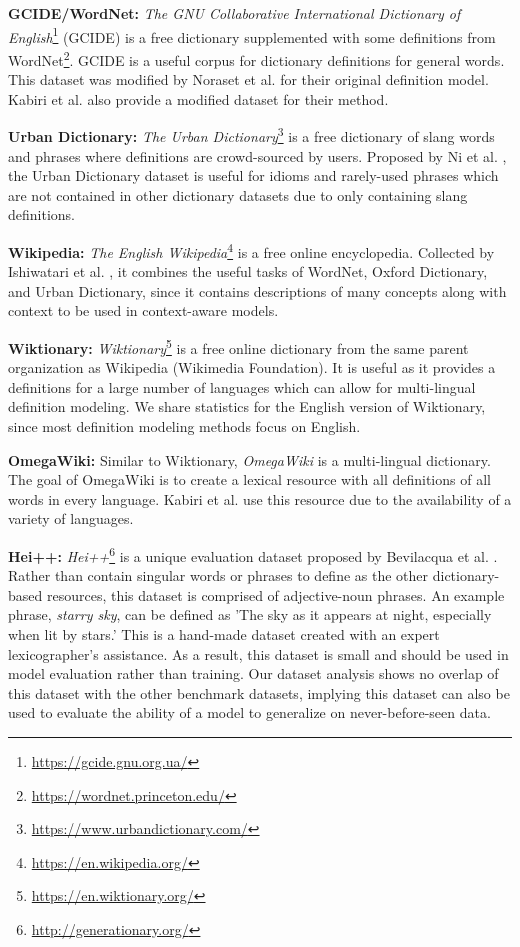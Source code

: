 \noindent\textbf{GCIDE/WordNet:}
\textit{The GNU Collaborative International Dictionary of
    English}\footnote{\href{https://gcide.gnu.org.ua/}{https://gcide.gnu.org.ua/}}
(GCIDE) is a free dictionary supplemented with some definitions from
WordNet\footnote{\href{https://wordnet.princeton.edu/}{https://wordnet.princeton.edu/}}.
GCIDE is a useful corpus for
dictionary definitions for general words. This dataset was modified by
Noraset et al. \cite{noraset_definition_2016} for their original definition
model. Kabiri et al. \cite{kabiri_evaluating_2020} also provide a modified
dataset for their method.

\noindent\textbf{Urban Dictionary:}
\textit{The Urban
    Dictionary}\footnote{\href{https://www.urbandictionary.com/}{https://www.urbandictionary.com/}}
is a free dictionary of slang words and phrases where definitions are
crowd-sourced by users. Proposed by Ni et al. \cite{ni_learning_2017}, the
Urban Dictionary dataset is useful for idioms and rarely-used phrases which
are not contained in other dictionary datasets due to only containing slang
definitions.

\noindent\textbf{Wikipedia:}
\textit{The English
    Wikipedia}\footnote{\href{https://en.wikipedia.org/}{https://en.wikipedia.org/}}
is a free online encyclopedia. Collected by Ishiwatari et al.
\cite{ishiwatari_learning_2019}, it combines the useful tasks of WordNet,
Oxford Dictionary, and Urban Dictionary, since it contains descriptions of
many concepts along with context to be used in context-aware models.

\noindent\textbf{Wiktionary:}
\textit{Wiktionary}\footnote{\href{https://en.wiktionary.org/}{https://en.wiktionary.org/}}
is a free online dictionary from the same parent organization as Wikipedia
(Wikimedia Foundation). It is useful as it provides a definitions for a large
number of languages which can allow for multi-lingual definition modeling. We
share statistics for the English version of Wiktionary, since most definition
modeling methods focus on English.

\noindent\textbf{OmegaWiki:}
Similar to Wiktionary, \textit{OmegaWiki} is a multi-lingual dictionary. The
goal of OmegaWiki is to create a lexical resource with all definitions of all
words in every language. Kabiri et al. \cite{kabiri_evaluating_2020} use this
resource due to the availability of a variety of languages.

\noindent\textbf{Hei++:}
\textit{Hei++}\footnote{\href{http://generationary.org/}{http://generationary.org/}}
is a unique evaluation dataset proposed by Bevilacqua et al.
\cite{bevilacqua_generationary_2020}. Rather than contain singular words or
phrases to define as the other dictionary-based resources, this dataset is comprised of adjective-noun phrases. An example phrase, \textit{starry sky}, can
be defined as 'The sky as it appears at night, especially when lit by stars.' This is a hand-made dataset created with an expert lexicographer's assistance. As a result, this dataset is small and should be used in model
evaluation rather than training. Our dataset analysis shows no overlap of this
dataset with the other benchmark datasets, implying this dataset can also be
used to evaluate the ability of a model to generalize on never-before-seen
data.

